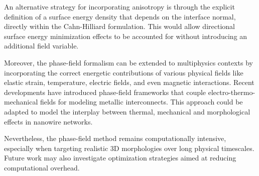 An alternative strategy for incorporating anisotropy is through the explicit definition of a surface energy density that depends on the interface normal, directly within the Cahn-Hilliard formulation. This would allow directional surface energy minimization effects to be accounted for without introducing an additional field variable.

Moreover, the phase-field formalism can be extended to multiphysics contexts by incorporating the correct energetic contributions of various physical fields like elastic strain, temperature, electric fields, and even magnetic interactions. Recent developments have introduced phase-field frameworks that couple electro-thermo-mechanical fields for modeling metallic interconnects. This approach could be adapted to model the interplay between thermal, mechanical and morphological effects in nanowire networks.

Nevertheless, the phase-field method remains computationally intensive, especially when targeting realistic 3D morphologies over long physical timescales. Future work may also investigate optimization strategies aimed at reducing computational overhead.
